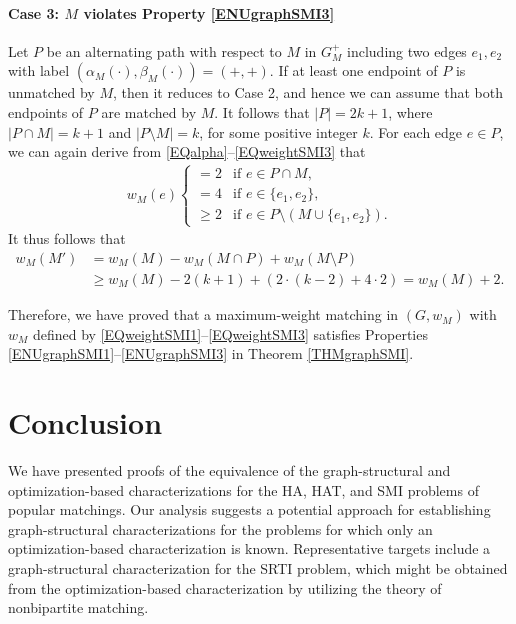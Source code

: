 \documentclass[11pt,a4paper,showkeys]{article}
\theoremstyle{plain}
\theoremstyle{definition}
\begin{document}
\paragraph{Case 3: $M$ violates Property \ref{ENUgraphSMI3}}
Let $P$ be an alternating path with respect to $M$ in $G_M^+$ 
including two edges $e_1,e_2$ with label $(\alpha_M(\cdot),\beta_M(\cdot))=(+,+)$. 
If at least one endpoint of $P$ is unmatched by $M$, 
then it reduces to Case 2, 
and hence we can assume that both endpoints of $P$ are matched by $M$. 
It follows that 
$|P|=2k+1$, 
where $|P\cap M| = k+1$ and $|P\setminus M|=k$, 
for some positive integer $k$. 
For each edge $e\in P$, 
we can again derive from \eqref{EQalpha}--\eqref{EQweightSMI3} that 
\begin{align*}
    w_M(e) 
    \begin{cases}
        =   2 & \mbox{if $e\in P\cap M$},\\
        = 4 & \mbox{if $e\in \{e_1,e_2\}$}, \\
        \ge 2 & \mbox{if $e\in P \setminus (M \cup \{e_1,e_2\})$}. 
    \end{cases}
\end{align*}
It thus follows that 
\begin{align*}
    w_M(M') 
    {}&{}= w_M(M) - w_M(M\cap P) + w_M(M\setminus P) \\
    {}&{}\ge w_M(M) - 2(k+1) + (2 \cdot (k-2) + 4\cdot 2) = w_M(M) + 2.
\end{align*}

\bigskip 

Therefore, 
we have proved that 
a maximum-weight matching in $(G, w_M)$ with $w_M$ defined by \eqref{EQweightSMI1}--\eqref{EQweightSMI3} satisfies Properties \ref{ENUgraphSMI1}--\ref{ENUgraphSMI3} 
in Theorem \ref{THMgraphSMI}. 



\section{Conclusion}
\label{SECcncl}

We have presented proofs of the equivalence of the graph-structural and optimization-based characterizations 
for the HA, HAT, and SMI problems of popular matchings. 
Our analysis suggests a potential approach for establishing graph-structural characterizations
for the problems for which only an optimization-based characterization is known. 
Representative targets include 
a graph-structural characterization for 
the SRTI problem, 
which might be obtained from the optimization-based characterization by utilizing the theory of nonbipartite matching. 



\end{document}
